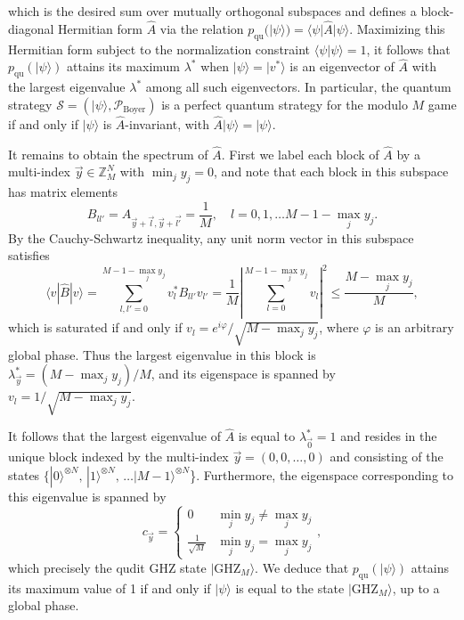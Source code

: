 \documentclass[prb,twocolumn,showpacs,amssymb,superscriptaddress]{revtex4-2}
\begin{document}
which is the desired sum over mutually orthogonal subspaces and defines a block-diagonal Hermitian form $\hat{A}$ via the relation $p_{\mathrm{qu}}(|\psi \rangle) = \langle \psi | \hat{A}| \psi \rangle$. Maximizing this Hermitian form subject to the normalization constraint $\langle \psi | \psi \rangle=1$, it follows that $p_{\mathrm{qu}}({|\psi\rangle})$ attains its maximum $\lambda^*$ when $|\psi\rangle = |v^*\rangle$ is an eigenvector of $\hat{A}$ with the largest eigenvalue $\lambda^*$ among all such eigenvectors. In particular, the quantum strategy $\mathcal{S} = (|\psi\rangle, \mathcal{P}_{\mathrm{Boyer}})$ is a perfect quantum strategy for the modulo $M$ game if and only if $|\psi\rangle$ is $\hat{A}$-invariant, with $\hat{A} |\psi\rangle = |\psi\rangle$.

It remains to obtain the spectrum of $\hat{A}$. First we label each block of $\hat{A}$ by a multi-index $\vec{y}\in\mathbb{Z}_M^N$ with $\min_j y_j = 0$, and note that each block in this subspace has matrix elements
\begin{equation}
B_{ll'} = A_{\vec{y}+\vec{l},\vec{y}+\vec{l'}} = \frac{1}{M}, \quad l = 0, 1, \ldots M-1-\max_j y_j.
\end{equation}
By the Cauchy-Schwartz inequality, any unit norm vector in this subspace satisfies
\begin{equation}
\langle v |\hat{B} | v\rangle = \sum_{l,l'=0}^{M-1-\max_j y_j} v_l^*B_{ll'}v_{l'} =\frac{1}{M}\left|\sum_{l=0}^{M-1-\max_j y_j} v_{l}\right|^2 \leq \frac{M-\max_{j} y_j}{M},
\end{equation}
which is saturated if and only if $v_l = e^{i\varphi}/\sqrt{M-\max_{j} y_j}$, where $\varphi$ is an arbitrary global phase. Thus the largest eigenvalue in this block is $\lambda^*_{\vec{y}} = (M-\max_j y_j)/M$, and its eigenspace is spanned by $v_l = 1/\sqrt{M-\max_{j} y_j}$.

It follows that the largest eigenvalue of $\hat{A}$ is equal to $\lambda^*_{\vec{0}} = 1$ and resides in the unique block indexed by the multi-index $\vec{y} = (0,0,\ldots,0)$ and consisting of the states $\{|0\rangle^{\otimes N}, \, |1 \rangle^{\otimes N}, \, \ldots |M-1\rangle^{\otimes N}$\}. Furthermore, the eigenspace corresponding to this eigenvalue is spanned by
\begin{equation}
c_{\vec{y}} = \begin{cases} 0 & \min_{j} y_j \neq \max_j y_j \\ \frac{1}{\sqrt{M}} & \min_{j} y_j = \max_j y_j\end{cases},
\end{equation}
which precisely the qudit GHZ state $|\mathrm{GHZ}_M\rangle$. We deduce that $p_{\mathrm{qu}}(|\psi\rangle)$ attains its maximum value of 1 if and only if $|\psi\rangle$ is equal to the state $|\mathrm{GHZ}_M\rangle$, up to a global phase. 
\end{document}
